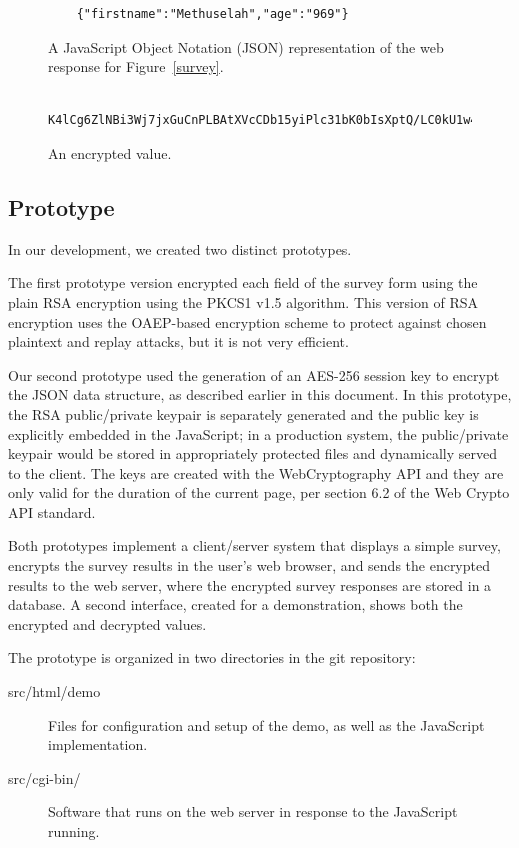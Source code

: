 \documentclass[fleqn,10pt]{wlscirep}
\begin{document}
\begin{figure}
  \begin{Verbatim}
    {"firstname":"Methuselah","age":"969"}
  \end{Verbatim}
  \caption{A JavaScript Object Notation (JSON) representation of the web response for Figure~\ref{survey}.}\label{json}
\end{figure}

\begin{figure}
  \begin{Verbatim}
    K4lCg6ZlNBi3Wj7jxGuCnPLBAtXVcCDb15yiPlc31bK0bIsXptQ/LC0kU1w4jdop
  \end{Verbatim}
  \caption{An encrypted value.}\label{encrypted}
\end{figure}


\subsection{Prototype}
In our development, we created two distinct prototypes.

The first prototype version encrypted each field of the survey form
using the plain RSA encryption using the PKCS1 v1.5
algorithm. This version of RSA encryption uses the OAEP-based
encryption scheme to protect against chosen plaintext and replay
attacks, but it is not very efficient. 

Our second prototype used the generation of an AES-256 session
key to encrypt the JSON data structure, as described earlier in this
document. In this prototype, the RSA public/private keypair is
separately generated and the public key is explicitly embedded in the JavaScript; in a production
system, the public/private keypair would be stored in appropriately
protected files and dynamically served to the client. The keys are
created with the WebCryptography API and they are only valid for the
duration of the current page, per section 6.2 of the Web Crypto API standard.

Both prototypes implement a client/server system that displays a
simple survey, encrypts the survey results in the user's web browser,
and sends the encrypted results to the web server, where the encrypted
survey responses are stored in a database. A second interface, created
for a demonstration, shows both the encrypted and decrypted values.

The prototype is organized in two directories in the git repository:

\begin{description}
  \item[src/html/demo] Files for configuration and setup of the demo,
    as well as the JavaScript implementation.
  \item[src/cgi-bin/] Software that runs on the web server in response
    to the JavaScript running.
\end{description}
\end{document}
